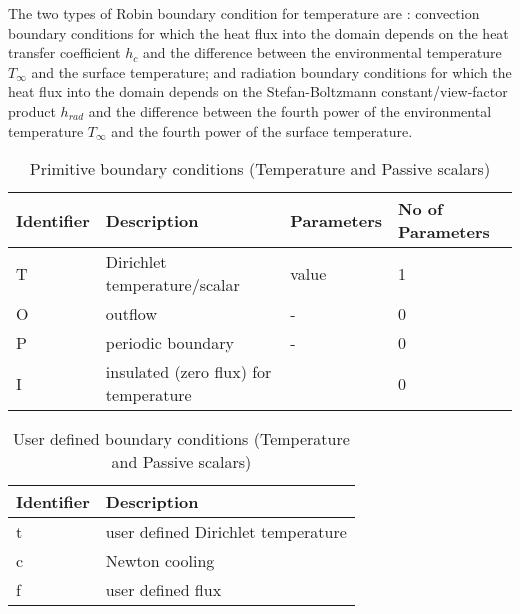 The two types of Robin boundary condition for temperature
are : convection boundary conditions for which the heat
flux into the domain depends on the heat transfer coefficient
\(h_{c}\) and the difference between the environmental temperature
\(T_{\infty}\) and the surface temperature; and radiation
boundary conditions for which the heat flux into the domain
depends on the Stefan-Boltzmann constant/view-factor
product \(h_{rad}\) and the difference between the fourth power
of the environmental temperature \(T_{\infty}\) and the fourth
power of the surface temperature.
\begin{table}
\begin{tabular}{ |l|l|l|l| }
   \hline
   Identifier & Description & Parameters&No of Parameters\\ \hline \hline
T    &   Dirichlet temperature/scalar    &   value                      &1 \\
O    &   outflow                         &   -                          &0  \\            
P    &   periodic boundary               &    -                         & 0\\
I    &   insulated (zero flux) for temperature&                        & 0\\
   \hline
\end{tabular}
\caption{Primitive boundary conditions (Temperature and Passive scalars)}\label{tab:primitiveBCt}
\end{table}

\begin{table}
\begin{tabular}{ |l|l| }
   \hline
   Identifier & Description\\ \hline \hline
t  &      user defined Dirichlet temperature\\
c   &     Newton cooling\\
f    &    user defined flux\\
   \hline
\end{tabular}
\caption{User defined boundary conditions (Temperature and Passive scalars)}\label{tab:userBCt}
\end{table}

